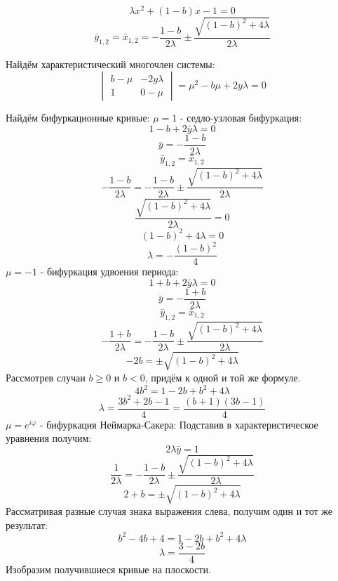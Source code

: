 \documentclass[12pt, a4paper]{article}
\begin{document}
\[ \lambda x^2 + (1 - b)x - 1 = 0 \]
\[ \bar y_{1,2} = \bar x_{1,2} = - \frac{1 - b}{2 \lambda} \pm \frac{\sqrt{(1 - b)^2 + 4 \lambda}}{2 \lambda} \]

Найдём характеристический многочлен системы:
\begin{equation*}
	\begin{vmatrix}
		b - \mu & -2y\lambda \\
		1 & 0 - \mu
	\end{vmatrix} =
	\mu^2 - b\mu + 2y\lambda = 0
\end{equation*}

Найдём бифуркационные кривые:
\newline
$\mu = 1$ - седло-узловая бифуркация:
\[ 1 - b + 2 \bar y \lambda = 0 \]
\[ \bar y = - \frac{1 - b}{2\lambda} \]
\[ \bar y_{1,2} = \bar x_{1, 2} \]
\[ - \frac{1 - b}{2\lambda} =  - \frac{1 - b}{2 \lambda} \pm \frac{\sqrt{(1 - b)^2 + 4 \lambda}}{2 \lambda} \]
\[ \frac{\sqrt{(1 - b)^2 + 4 \lambda}}{2 \lambda} = 0 \] 
\[ (1 - b)^2 + 4 \lambda = 0 \]
\[ \lambda = -\frac{(1 - b)^2}{4} \] 
\newline
$\mu = -1$ - бифуркация удвоения периода:
\[ 1 + b + 2 \bar y \lambda = 0 \]
\[ \bar y = - \frac{1 + b}{2\lambda} \]
\[ \bar y_{1,2} = \bar x_{1, 2} \]
\[ - \frac{1 + b}{2\lambda} =  - \frac{1 - b}{2 \lambda} \pm \frac{\sqrt{(1 - b)^2 + 4 \lambda}}{2 \lambda} \]
\[ -2b = \pm \sqrt{(1 - b)^2 + 4 \lambda} \]
Рассмотрев случаи $b \geq 0$ и $b < 0$, придём к одной и той же формуле.
\[ 4b^2 = 1 - 2b + b^2 + 4\lambda \]
\[ \lambda = \frac{3b^2 + 2b - 1}{4} = \frac{(b + 1)(3b - 1)}{4} \]
\newline
$\mu = e^{i\varphi}$ - бифуркация Неймарка-Сакера:
\newline 
Подставив в характеристическое уравнения получим:
\[ 2\lambda \bar y = 1 \]
\[ \frac{1}{2\lambda} = - \frac{1 - b}{2 \lambda} \pm \frac{\sqrt{(1 - b)^2 + 4 \lambda}}{2 \lambda} \]
\[ 2 + b = \pm \sqrt{(1 - b)^2 + 4 \lambda} \]
Рассматривая разные случая знака выражения слева, получим один и тот же результат:
\[ b^2 - 4b + 4 = 1 - 2b + b^2 + 4\lambda \]
\[ \lambda = \frac{3 - 2b}{4} \]
Изобразим получившиеся кривые на плоскости.
\end{document}
